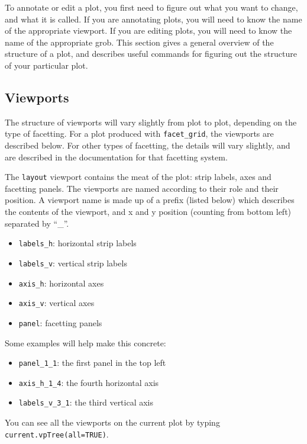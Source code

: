 To annotate or edit a plot, you first need to figure out what you want to change, and what it is called.  If you are annotating plots, you will need to know the name of the appropriate viewport.  If you are editing plots, you will need to know the name of the appropriate grob.  This section gives a general overview of the structure of a plot, and describes useful commands for figuring out the structure of your particular plot.

\subsection{Viewports}\label{sub:viewports}

The structure of viewports will vary slightly from plot to plot, depending on the type of facetting.  For a plot produced with {\tt facet\_grid}, the viewports are described below.  For other types of facetting, the details will vary slightly, and are described in the documentation for that facetting system.  

The {\tt layout} viewport contains the meat of the plot: strip labels, axes and facetting panels.  The viewports are named according to their role and their position.  A viewport name is made up of a prefix (listed below) which describes the contents of the viewport, and x and y position (counting from bottom left) separated by ``\_''.

\begin{itemize}
  \item {\tt labels\_h}: horizontal strip labels
  \item {\tt labels\_v}: vertical strip labels
  \item {\tt axis\_h}: horizontal axes
  \item {\tt axis\_v}: vertical axes
  \item {\tt panel}: facetting panels
\end{itemize}

Some examples will help make this concrete:

\begin{itemize}
  \item {\tt panel\_1\_1}: the first panel in the top left
  \item {\tt axis\_h\_1\_4}: the fourth horizontal axis
  \item {\tt labels\_v\_3\_1}: the third vertical axis
\end{itemize}

You can see all the viewports on the current plot by typing {\tt current.vpTree(all=TRUE)}.

